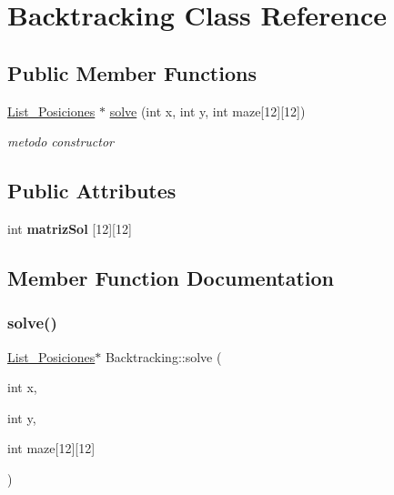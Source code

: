 \hypertarget{classBacktracking}{}\section{Backtracking Class Reference}
\label{classBacktracking}
\subsection*{Public Member Functions}
\begin{DoxyCompactItemize}
\item 
\hyperlink{classList__Posiciones}{List\+\_\+\+Posiciones} $\ast$ \hyperlink{classBacktracking_a64d78158f0e9eee4842c4cab91f04ecf}{solve} (int x, int y, int maze\mbox{[}12\mbox{]}\mbox{[}12\mbox{]})
\begin{DoxyCompactList}\small\item\em metodo constructor \end{DoxyCompactList}\end{DoxyCompactItemize}
\subsection*{Public Attributes}
\begin{DoxyCompactItemize}
\item 
int {\bfseries matriz\+Sol} \mbox{[}12\mbox{]}\mbox{[}12\mbox{]}
\end{DoxyCompactItemize}


\subsection{Member Function Documentation}
\mbox{\label{classBacktracking_a64d78158f0e9eee4842c4cab91f04ecf}} 
\subsubsection{\texorpdfstring{solve()}{solve()}}
{\footnotesize\ttfamily \hyperlink{classList__Posiciones}{List\+\_\+\+Posiciones}$\ast$ Backtracking\+::solve (\begin{DoxyParamCaption}\item[{int}]{x,  }\item[{int}]{y,  }\item[{int}]{maze\mbox{[}12\mbox{]}\mbox{[}12\mbox{]} }\end{DoxyParamCaption})\hspace{0.3cm}{\ttfamily [inline]}}



